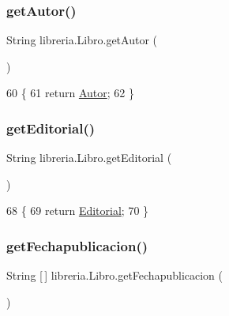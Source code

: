 \subsubsection{\texorpdfstring{get\+Autor()}{getAutor()}}
{\footnotesize\ttfamily String libreria.\+Libro.\+get\+Autor (\begin{DoxyParamCaption}{ }\end{DoxyParamCaption})\hspace{0.3cm}{\ttfamily [inline]}}


\begin{DoxyCode}
60                              \{
61         \textcolor{keywordflow}{return} \mbox{\hyperlink{classlibreria_1_1_libro_aa5040773b6ae3f4b9538418a4499ba9c}{Autor}};
62     \}
\end{DoxyCode}
\mbox{\label{classlibreria_1_1_libro_a2c75d916c4636900590dc6ed9be19c13}} 
\subsubsection{\texorpdfstring{get\+Editorial()}{getEditorial()}}
{\footnotesize\ttfamily String libreria.\+Libro.\+get\+Editorial (\begin{DoxyParamCaption}{ }\end{DoxyParamCaption})\hspace{0.3cm}{\ttfamily [inline]}}


\begin{DoxyCode}
68                                  \{
69         \textcolor{keywordflow}{return} \mbox{\hyperlink{classlibreria_1_1_libro_a0e45b510f79de7f6aaa678f4cf060b45}{Editorial}};
70     \}
\end{DoxyCode}
\mbox{\label{classlibreria_1_1_libro_a95dc4e4af6ec1bc331dfbc9f450332ef}} 
\subsubsection{\texorpdfstring{get\+Fechapublicacion()}{getFechapublicacion()}}
{\footnotesize\ttfamily String \mbox{[}$\,$\mbox{]} libreria.\+Libro.\+get\+Fechapublicacion (\begin{DoxyParamCaption}{ }\end{DoxyParamCaption})\hspace{0.3cm}{\ttfamily [inline]}}


